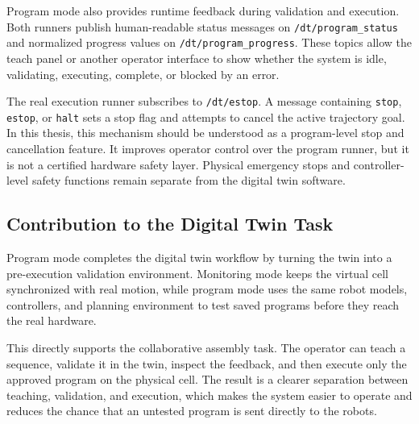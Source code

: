 Program mode also provides runtime feedback during validation and execution. Both runners publish human-readable status messages on \texttt{/dt/program\_status} and normalized progress values on \texttt{/dt/program\_progress}. These topics allow the teach panel or another operator interface to show whether the system is idle, validating, executing, complete, or blocked by an error.

The real execution runner subscribes to \texttt{/dt/estop}. A message containing \texttt{stop}, \texttt{estop}, or \texttt{halt} sets a stop flag and attempts to cancel the active trajectory goal. In this thesis, this mechanism should be understood as a program-level stop and cancellation feature. It improves operator control over the program runner, but it is not a certified hardware safety layer. Physical emergency stops and controller-level safety functions remain separate from the digital twin software.

\subsection{Contribution to the Digital Twin Task}

Program mode completes the digital twin workflow by turning the twin into a pre-execution validation environment. Monitoring mode keeps the virtual cell synchronized with real motion, while program mode uses the same robot models, controllers, and planning environment to test saved programs before they reach the real hardware.

This directly supports the collaborative assembly task. The operator can teach a sequence, validate it in the twin, inspect the feedback, and then execute only the approved program on the physical cell. The result is a clearer separation between teaching, validation, and execution, which makes the system easier to operate and reduces the chance that an untested program is sent directly to the robots.
